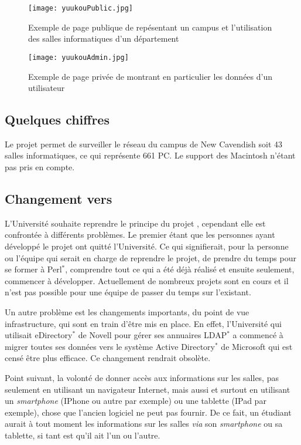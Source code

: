 \begin{figure}[!ht]
	\centering
	\texttt{[image: yuukouPublic.jpg]}
	\caption{Exemple de page publique de \Yuukou{} rep\'esentant un campus et l'utilisation des salles informatiques d'un d\'epartement}
	\label{figure:yuukouPublic}

\end{figure}

\begin{figure}[!ht]
	\centering
	\texttt{[image: yuukouAdmin.jpg]}
	\caption{Exemple de page priv\'ee de \Yuukou{} montrant en particulier les donn\'ees d'un utilisateur}
	\label{figure:yuukouAdmin}

\end{figure}

\subsection{Quelques chiffres}

Le projet \Yuukou{} permet de surveiller le r\'eseau du campus de New Cavendish soit 43 salles informatiques, ce qui repr\'esente 661 PC. 
Le support des Macintosh n'\'etant pas pris en compte.

\subsection{Changement vers \YuukouII}

L'Universit\'e souhaite reprendre le principe du projet \Yuukou, cependant elle est confront\'ee \`a diff\'erents probl\`emes.
Le premier \'etant que les personnes ayant d\'evelopp\'e le projet ont quitt\'e l'Universit\'e. 
Ce qui signifierait, pour la personne ou l'\'equipe qui serait en charge de reprendre le projet, de prendre du temps pour se former \`a Perl$^*$, comprendre tout ce qui a \'et\'e d\'ej\`a r\'ealis\'e et ensuite seulement, commencer \`a d\'evelopper.
Actuellement de nombreux projets sont en cours et il n'est pas possible pour une \'equipe de passer du temps sur l'existant.

Un autre probl\`eme est les changements importants, du point de vue infrastructure, qui sont en train d'\^etre mis en place.
En effet, l'Universit\'e qui utilisait eDirectory$^*$ de Novell pour g\'erer ses annuaires LDAP$^*$ a commenc\'e \`a migrer toutes ses donn\'ees vers le syst\`eme Active Directory$^*$ de Microsoft qui est cens\'e \^etre plus efficace. Ce changement rendrait \Yuukou{} obsol\`ete.

Point suivant, la volont\'e de donner acc\`es aux informations sur les salles, pas seulement en utilisant un navigateur Internet, mais aussi et surtout en utilisant un \textit{smartphone} (IPhone ou autre par exemple) ou une tablette (IPad par exemple), chose que l'ancien logiciel ne peut pas fournir.
De ce fait, un \'etudiant aurait \`a tout moment les informations sur les salles \textit{via} son \textit{smartphone} ou sa tablette, si tant est qu'il ait l'un ou l'autre.


